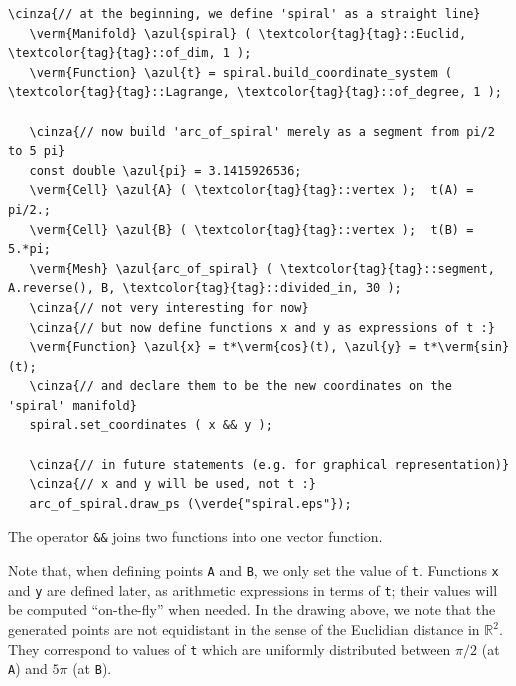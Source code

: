 \begin{Verbatim}[commandchars=\\\{\},formatcom=\small\tt,frame=single,
   label=parag-\ref{\numb section 2.\numb parag 14}.cpp,rulecolor=\color{coment},
   baselinestretch=0.94,framesep=2mm]
   \cinza{// at the beginning, we define 'spiral' as a straight line}
   \verm{Manifold} \azul{spiral} ( \textcolor{tag}{tag}::Euclid, \textcolor{tag}{tag}::of_dim, 1 );
   \verm{Function} \azul{t} = spiral.build_coordinate_system ( \textcolor{tag}{tag}::Lagrange, \textcolor{tag}{tag}::of_degree, 1 );

   \cinza{// now build 'arc_of_spiral' merely as a segment from pi/2 to 5 pi}
   const double \azul{pi} = 3.1415926536;
   \verm{Cell} \azul{A} ( \textcolor{tag}{tag}::vertex );  t(A) =  pi/2.;
   \verm{Cell} \azul{B} ( \textcolor{tag}{tag}::vertex );  t(B) =  5.*pi;
   \verm{Mesh} \azul{arc_of_spiral} ( \textcolor{tag}{tag}::segment, A.reverse(), B, \textcolor{tag}{tag}::divided_in, 30 );
   \cinza{// not very interesting for now}
   \cinza{// but now define functions x and y as expressions of t :}
   \verm{Function} \azul{x} = t*\verm{cos}(t), \azul{y} = t*\verm{sin}(t);
   \cinza{// and declare them to be the new coordinates on the 'spiral' manifold}
   spiral.set_coordinates ( x && y );

   \cinza{// in future statements (e.g. for graphical representation)}
   \cinza{// x and y will be used, not t :}
   arc_of_spiral.draw_ps (\verde{"spiral.eps"});
\end{Verbatim}

The operator {\small\tt \&\&} joins two functions into one vector function.

Note that, when defining points {\small\tt A} and {\small\tt B}, we only set the value of {\small\tt t}.
Functions {\small\tt x} and {\small\tt y} are defined later, as arithmetic expressions in terms of
{\small\tt t}; their values will be computed ``on-the-fly'' when needed.
In the drawing above, we note that the generated points are not equidistant in the sense of the
Euclidian distance in $ \mathbb{R}^2 $.
They correspond to values of {\small\tt t} which are uniformly distributed between
$ \pi/2 $ (at {\small\tt A}) and $ 5\pi $ (at {\small\tt B}).


